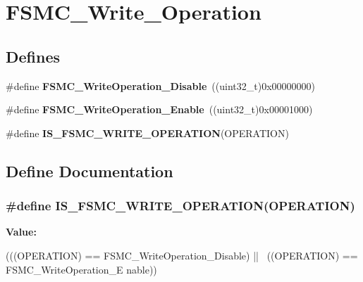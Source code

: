 \hypertarget{group__FSMC__Write__Operation}{
\section{FSMC\_\-Write\_\-Operation}
\label{group__FSMC__Write__Operation}
}
\subsection*{Defines}
\begin{DoxyCompactItemize}
\item 
\hypertarget{group__FSMC__Write__Operation_ga74176320484248f06abae854170f9d9f}{
\#define {\bfseries FSMC\_\-WriteOperation\_\-Disable}~((uint32\_\-t)0x00000000)}
\label{group__FSMC__Write__Operation_ga74176320484248f06abae854170f9d9f}

\item 
\hypertarget{group__FSMC__Write__Operation_ga2478beb6dd8861b34a16b8a57a795e56}{
\#define {\bfseries FSMC\_\-WriteOperation\_\-Enable}~((uint32\_\-t)0x00001000)}
\label{group__FSMC__Write__Operation_ga2478beb6dd8861b34a16b8a57a795e56}

\item 
\#define {\bfseries IS\_\-FSMC\_\-WRITE\_\-OPERATION}(OPERATION)
\end{DoxyCompactItemize}


\subsection{Define Documentation}
\hypertarget{group__FSMC__Write__Operation_ga87fc20d11761caa66c3e7d77a3a7d3e3}{
\subsubsection[{IS\_\-FSMC\_\-WRITE\_\-OPERATION}]{\setlength{\rightskip}{0pt plus 5cm}\#define IS\_\-FSMC\_\-WRITE\_\-OPERATION(OPERATION)}}
\label{group__FSMC__Write__Operation_ga87fc20d11761caa66c3e7d77a3a7d3e3}
{\bfseries Value:}
\begin{DoxyCode}
(((OPERATION) == FSMC_WriteOperation_Disable) || \
                                            ((OPERATION) == FSMC_WriteOperation_E
      nable))
\end{DoxyCode}
